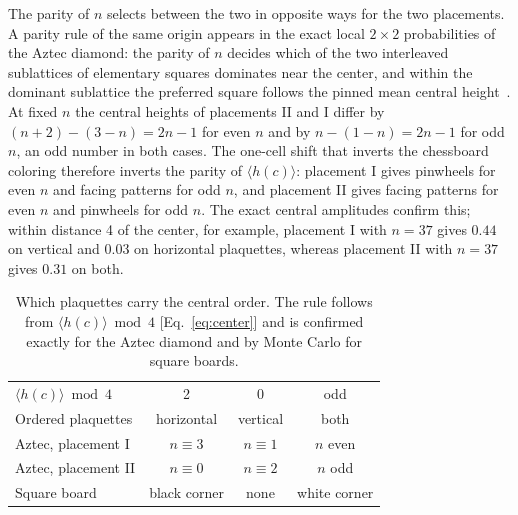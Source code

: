 \documentclass[aps,prb,twocolumn,floatfix,longbibliography]{revtex4-2}
\begin{document}
The parity of $n$ selects between the two in opposite ways for the two placements. A parity rule of the same origin appears in the exact local $2\times2$ probabilities of the Aztec diamond: the parity of $n$ decides which of the two interleaved sublattices of elementary squares dominates near the center, and within the dominant sublattice the preferred square follows the pinned mean central height~\cite{Kim2026}. At fixed $n$ the central heights of placements II and I differ by $(n+2)-(3-n)=2n-1$ for even $n$ and by $n-(1-n)=2n-1$ for odd $n$, an odd number in both cases. The one-cell shift that inverts the chessboard coloring therefore inverts the parity of $\langle h(c)\rangle$: placement I gives pinwheels for even $n$ and facing patterns for odd $n$, and placement II gives facing patterns for even $n$ and pinwheels for odd $n$. The exact central amplitudes confirm this; within distance 4 of the center, for example, placement I with $n=37$ gives $0.44$ on vertical and $0.03$ on horizontal plaquettes, whereas placement II with $n=37$ gives $0.31$ on both.

\begin{table}[b]
\caption{Which plaquettes carry the central order. The rule follows from $\langle h(c)\rangle\bmod4$ [Eq.~\eqref{eq:center}] and is confirmed exactly for the Aztec diamond and by Monte Carlo for square boards.}
\label{tab:orient}
\begin{ruledtabular}
\begin{tabular}{lccc}
$\langle h(c)\rangle\bmod4$ & 2 & 0 & odd\\
Ordered plaquettes & horizontal & vertical & both\\
\hline
Aztec, placement I & $n\equiv3$ & $n\equiv1$ & $n$ even\\
Aztec, placement II & $n\equiv0$ & $n\equiv2$ & $n$ odd\\
Square board & black corner & none & white corner\\
\end{tabular}
\end{ruledtabular}
\end{table}
\end{document}
